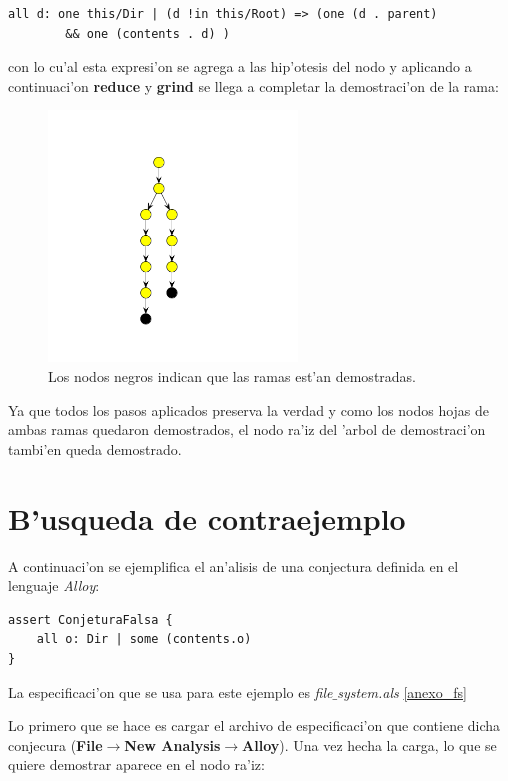\begin{verbatim}
all d: one this/Dir | (d !in this/Root) => (one (d . parent)
		&& one (contents . d) )
\end{verbatim}

con lo cu'al esta expresi'on se agrega a las hip'otesis del nodo y aplicando a continuaci'on \textbf{reduce} y \textbf{grind} se llega a completar la demostraci'on de la rama:

\begin{figure}[H]
	\includegraphics[width=250px]{img/ejemplo/15.png}
	\centering
	\caption{Los nodos negros indican que las ramas est'an demostradas.}
\end{figure}

Ya que todos los pasos aplicados preserva la verdad y como los nodos hojas de ambas ramas quedaron demostrados, el nodo ra'iz del 'arbol de demostraci'on tambi'en queda demostrado.


\section{B'usqueda de contraejemplo}

A continuaci'on se ejemplifica el an'alisis de una conjectura definida en el lenguaje \textit{Alloy}:

\begin{verbatim}
assert ConjeturaFalsa {
    all o: Dir | some (contents.o)
}
\end{verbatim}

La especificaci'on que se usa para este ejemplo es \textit{file$\_$system.als} \ref{anexo_fs}

Lo primero que se hace es cargar el archivo de especificaci'on que contiene dicha conjecura (\textbf{File$\rightarrow$New Analysis$\rightarrow$Alloy}). Una vez hecha la carga, lo que se quiere demostrar aparece en el nodo ra'iz:

